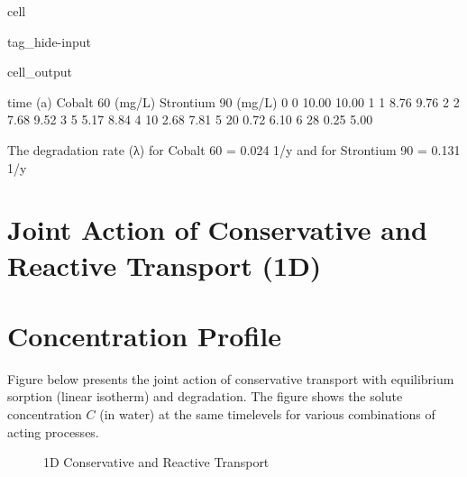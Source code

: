 \documentclass[letterpaper,10pt,english]{jupyterBook}
\begin{document}
\begin{sphinxuseclass}{cell}
\begin{sphinxuseclass}{tag_hide-input}\begin{sphinxVerbatimOutput}

\begin{sphinxuseclass}{cell_output}
\begin{sphinxVerbatim}[commandchars=\\\{\}]
   time (a)  Cobalt 60 (mg/L)  Strontium 90 (mg/L)
0         0             10.00                10.00
1         1              8.76                 9.76
2         2              7.68                 9.52
3         5              5.17                 8.84
4        10              2.68                 7.81
5        20              0.72                 6.10
6        28              0.25                 5.00

 The degradation rate (λ) for Cobalt 60 = 0.024 1/y and for Strontium 90 = 0.131 1/y 
\end{sphinxVerbatim}

\noindent{}

\end{sphinxuseclass}\end{sphinxVerbatimOutput}

\end{sphinxuseclass}
\end{sphinxuseclass}

\section{Joint Action of Conservative and Reactive Transport (1D)}
\label{\detokenize{content/transport/L10/22_reactive_transport:joint-action-of-conservative-and-reactive-transport-1d}}

\section{Concentration Profile}
\label{\detokenize{content/transport/L10/22_reactive_transport:concentration-profile}}
\sphinxAtStartPar
Figure below presents the joint action of conservative transport with equilibrium sorption (linear isotherm) and degradation. The figure shows the solute concentration \(C\) (in water) at the same time\sphinxhyphen{}levels for various combinations of acting processes.

\begin{figure}[htbp]
\centering
\capstart

\noindent{}
\caption{1D Conservative and Reactive Transport}\label{\detokenize{content/transport/L10/22_reactive_transport:d-cons-react}}\end{figure}
\end{document}
